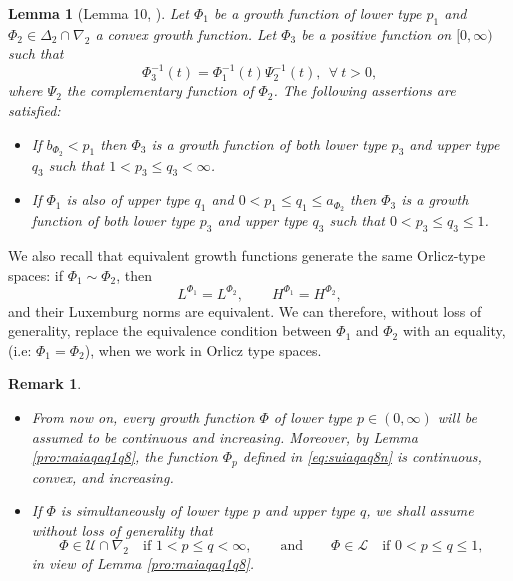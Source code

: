 \documentclass[a4paper,12pt,intlimits,oneside]{amsart}
\newtheorem{lemme}[theorem]{Lemma}
\newtheorem{remark}[theorem]{Remark}
\theoremstyle{definition}
\numberwithin{equation}{section}
\theoremstyle{definition}
\begin{document}
\begin{lemme}[Lemma 10, \cite{djefeuto1}]\label{pro:mainfqmaqpq5}
Let  $\Phi_{1}$ be a growth function of lower type $p_{1}$ and  $\Phi_{2} \in \Delta_{2} \cap \nabla_{2}$  a convex  growth function. Let $\Phi_{3}$ be a  positive function   on $[0, \infty)$ such that
\begin{equation}\label{eq:deltAQa2}
\Phi_{3}^{-1}(t) =\Phi_{1}^{-1}(t)\Psi_{2}^{-1}(t),~ ~\forall~ t >  0,\end{equation}
where   $\Psi_{2}$  the complementary function of $\Phi_{2}$. The following assertions are satisfied:
\begin{itemize}
\item[(i)] If  $ b_{\Phi_{2}} < p_{1}$ then  $\Phi_{3}$ is a growth function of both lower type $p_{3}$ and upper type  $q_{3}$ such that  $1< p_{3} \leq q_{3}< \infty$.
\item[(ii)] If  $\Phi_{1}$ is also of upper type $q_{1}$ and  $0<p_{1} \leq q_{1} \leq  a_{\Phi_{2}}$ then   $\Phi_{3}$ is  a growth function of both lower type $p_{3}$ and upper type $q_{3}$ such that  $0<p_{3} \leq q_{3} \leq 1$.
\end{itemize} 
\end{lemme}


\medskip

\noindent
We also recall that equivalent growth functions generate the same Orlicz-type spaces: if $\Phi_1 \sim \Phi_2$, then
\[
L^{\Phi_1} = L^{\Phi_2}, \qquad H^{\Phi_1} = H^{\Phi_2},
\]
and their Luxemburg norms are equivalent. We can therefore, without loss of generality, replace the equivalence condition between  $\Phi_{1}$ and  $\Phi_{2}$ with an equality, (i.e:  $\Phi_{1}=\Phi_{2}$), when we work in Orlicz type spaces.



\medskip

\begin{remark}\label{pro:main 5aqaqq2pl}
\begin{itemize}
\item[(i)] From now on, every growth function $\Phi$ of lower type $p \in (0,\infty)$ will be assumed to be continuous and increasing. Moreover, by Lemma \ref{pro:maiaqaq1q8}, the function $\Phi_p$ defined in \eqref{eq:suiaqaq8n} is continuous, convex, and increasing.
\medskip
\item[(ii)] If $\Phi$ is simultaneously of lower type $p$ and upper type $q$, we shall assume without loss of generality that
\[
\Phi \in \mathscr{U} \cap \nabla_2 \quad \text{if } 1 < p \leq q < \infty,
\qquad \text{and} \qquad
\Phi \in \mathscr{L} \quad \text{if } 0 < p \leq q \leq 1,
\]
in view of Lemma \ref{pro:maiaqaq1q8}.
\end{itemize}
\end{remark}
\end{document}
